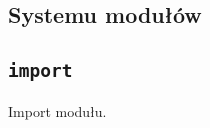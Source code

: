 \subsection{Systemu modułów}
\label{viua_vm_ops_module_system}

\subsection{\texttt{import}}

Import modułu.
